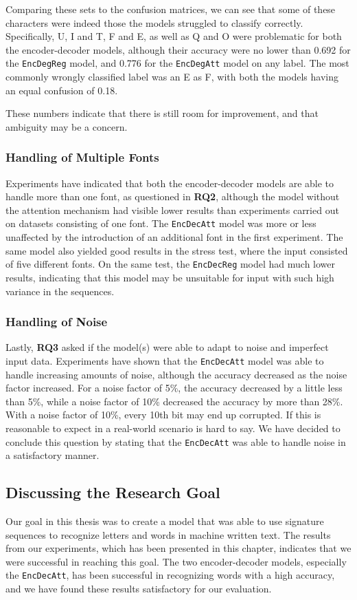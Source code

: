 Comparing these sets to the confusion matrices, we can see that some of these characters were indeed those the models struggled to classify correctly. Specifically, U, I and T, F and E, as well as Q and O were problematic for both the encoder-decoder models, although their accuracy were no lower than 0.692 for the {\tt EncDegReg} model, and 0.776 for the {\tt EncDegAtt} model on any label. The most commonly wrongly classified label was an E as F, with both the models having an equal confusion of 0.18. 

These numbers indicate that there is still room for improvement, and that ambiguity may be a concern.

\subsubsection{Handling of Multiple Fonts}
Experiments have indicated that both the encoder-decoder models are able to handle more than one font, as questioned in \textbf{RQ2}, although the model without the attention mechanism had visible lower results than experiments carried out on datasets consisting of one font. The {\tt EncDecAtt} model was more or less unaffected by the introduction of an additional font in the first experiment. The same model also yielded good results in the stress test, where the input consisted of five different fonts. On the same test, the {\tt EncDecReg} model had much lower results, indicating that this model may be unsuitable for input with such high variance in the sequences.

\subsubsection{Handling of Noise}
Lastly, \textbf{RQ3} asked if the model(s) were able to adapt to noise and imperfect input data. Experiments have shown that the {\tt EncDecAtt} model was able to handle increasing amounts of noise, although the accuracy decreased as the noise factor increased. For a noise factor of 5\%, the accuracy decreased by a little less than 5\%, while a noise factor of 10\% decreased the accuracy by more than 28\%. With a noise factor of 10\%, every 10th bit may end up corrupted. If this is reasonable to expect in a real-world scenario is hard to say. We have decided to conclude this question by stating that the {\tt EncDecAtt} was able to handle noise in a satisfactory manner.

\subsection{Discussing the Research Goal}
Our goal in this thesis was to create a model that was able to use signature sequences to recognize letters and words in machine written text. The results from our experiments, which has been presented in this chapter, indicates that we were successful in reaching this goal. The two encoder-decoder models, especially the {\tt EncDecAtt}, has been successful in recognizing words with a high accuracy, and we have found these results satisfactory for our evaluation.

